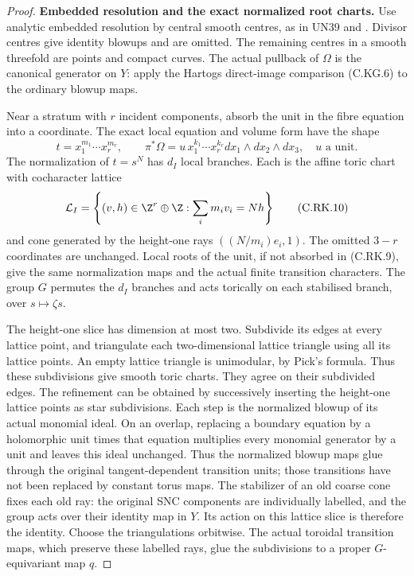 \begin{proof}
\par\medskip\noindent\textbf{Embedded resolution and the exact normalized root charts.}
Use analytic embedded resolution by central
smooth centres, as in UN39 and
\cite[Theorems~1.6 and1.10]{BierstoneMilman1997}.
Divisor centres give identity blowups and are
omitted. The remaining centres in a smooth
threefold are points and compact curves.
The actual pullback of $\Omega$ is the
canonical generator on $Y$: apply the
Hartogs direct-image comparison (C.KG.6)
to the ordinary blowup maps.

Near a stratum with $r$ incident components,
absorb the unit in the fibre equation into
a coordinate. The exact local equation and
volume form have the shape
\[
 t=x_1^{m_1}\cdots x_r^{m_r},\qquad
 \pi^*\Omega=u\,x_1^{k_1}\cdots x_r^{k_r}
                         dx_1\wedge dx_2\wedge dx_3,
                         \quad u\text{ a unit}.
\tag{C.RK.9}
\]
The normalization of $t=s^N$ has $d_I$
local branches. Each is the affine toric
chart with cocharacter lattice
\[
 \mathcal L_I=\left\{(v,h)\in\Z^r\oplus\Z:
                         \sum_i m_iv_i=Nh\right\}
\tag{C.RK.10}
\]
and cone generated by the height-one rays
$((N/m_i)e_i,1)$. The omitted $3-r$
coordinates are unchanged. Local roots of
the unit, if not absorbed in (C.RK.9),
give the same normalization maps and
the actual finite transition characters.
The group $G$ permutes the $d_I$ branches
and acts torically on each stabilised
branch, over $s\mapsto\zeta s$.

The height-one slice has dimension at most
two. Subdivide its edges at every lattice
point, and triangulate each two-dimensional
lattice triangle using all its lattice
points. An empty lattice triangle is
unimodular, by Pick's formula. Thus these
subdivisions give smooth toric charts.
They agree on their subdivided edges.
The refinement can be obtained by
successively inserting the height-one
lattice points as star subdivisions.
Each step is the normalized blowup
of its actual monomial ideal. On an
overlap, replacing a boundary equation
by a holomorphic unit times that
equation multiplies every monomial
generator by a unit and leaves this
ideal unchanged. Thus the normalized
blowup maps glue through the original
tangent-dependent transition units;
those transitions have not been
replaced by constant torus maps.
The stabilizer of an old coarse cone fixes
each old ray: the original SNC components
are individually labelled, and the group
acts over their identity map in $Y$.
Its action on this lattice slice is
therefore the identity. Choose the
triangulations orbitwise. The actual
toroidal transition maps, which preserve
these labelled rays, glue the subdivisions
to a proper $G$-equivariant map $q$.


\end{proof}
